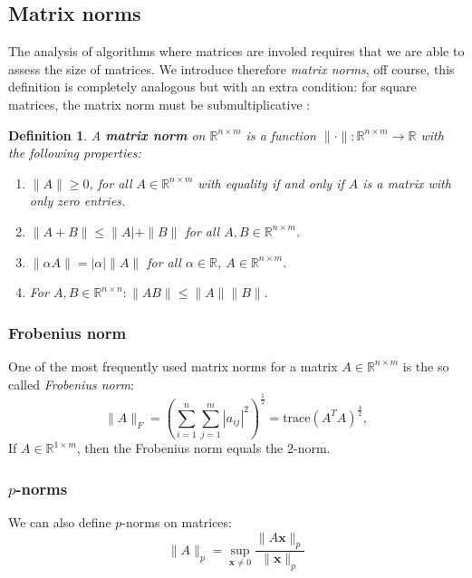 \documentclass[a4paper,11pt]{report}
\newtheorem{definition}[theorem]{Definition}
\newcommand{\R}{{\mathbb R}}
\begin{document}
\subsection{Matrix norms}
The analysis of algorithms where matrices are involed requires that we are able to assess the size of 
matrices. We introduce therefore \textit{matrix norms}, off course, this 
definition is completely analogous but with an extra condition: for square matrices, the matrix norm must 
be submultiplicative :
\begin{definition}
  A \textbf{matrix norm} on $\R^{n\times m}$ is a function $\|\cdot\|: \R^{n\times m} \to \R$ with 
  the following properties:
  \begin{enumerate}
 \item $\|A\| \geq 0$, for all $A \in \R^{n\times m}$ with equality if 
 and only if $A$ is a matrix with only zero entries.
 \item $\|A + B\| \leq \|A| + \|B\|$ for 
 all $A, B \in \R^{n\times m}$.
 \item $\|\alpha A\| = |\alpha|\|A\|$ for all $\alpha \in \R$, $A \in 
 \R^{n\times m}$.
 \item For $A, B \in \R^{n\times n}: \|AB\|\leq \|A\|\|B\|.$
  \end{enumerate}
\end{definition}
\subsubsection{Frobenius norm}
One of the most frequently used matrix norms for a matrix $A \in \R^{n\times m}$ is the so called \textit{Frobenius norm}:
$$\|A\|_F = \left(\sum_{i=1}^n \sum_{j=1}^m |a_{ij}|^2\right)^{\frac{1}{2}} = \text{trace}(A^TA)^{\frac{1}{2}} ,$$
If $A \in \R^{1\times m}$, then the Frobenius norm equals the 2-norm.

\subsubsection{$p$-norms}
We can also define $p$-norms on matrices:
$$\|A\|_p = \sup_{\mathbf{x}\not = 0} \frac{\|A\mathbf{x}\|_p}{\|\mathbf{x}\|_p}$$
\end{document}
